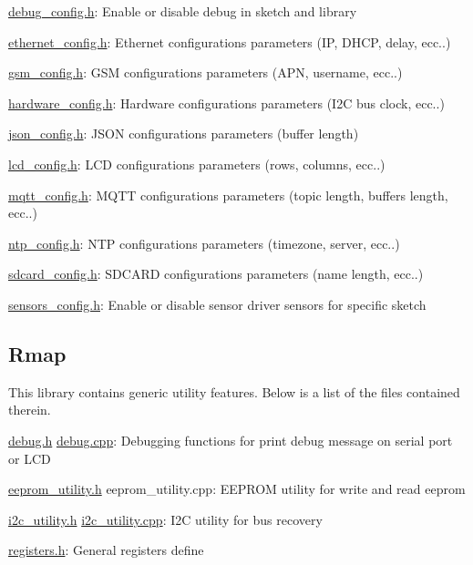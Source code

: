 \hyperlink{debug__config_8h}{debug\+\_\+config.\+h}\+: Enable or disable debug in sketch and library

\hyperlink{ethernet__config_8h}{ethernet\+\_\+config.\+h}\+: Ethernet configuration\textquotesingle{}s parameters (IP, D\+H\+CP, delay, ecc..)

\hyperlink{gsm__config_8h}{gsm\+\_\+config.\+h}\+: G\+SM configuration\textquotesingle{}s parameters (A\+PN, username, ecc..)

\hyperlink{hardware__config_8h}{hardware\+\_\+config.\+h}\+: Hardware configuration\textquotesingle{}s parameters (I2C bus clock, ecc..)

\hyperlink{json__config_8h}{json\+\_\+config.\+h}\+: J\+S\+ON configuration\textquotesingle{}s parameters (buffer length)

\hyperlink{lcd__config_8h}{lcd\+\_\+config.\+h}\+: L\+CD configuration\textquotesingle{}s parameters (rows, columns, ecc..)

\hyperlink{mqtt__config_8h}{mqtt\+\_\+config.\+h}\+: M\+Q\+TT configuration\textquotesingle{}s parameters (topic length, buffers length, ecc..)

\hyperlink{ntp__config_8h}{ntp\+\_\+config.\+h}\+: N\+TP configuration\textquotesingle{}s parameters (timezone, server, ecc..)

\hyperlink{sdcard__config_8h}{sdcard\+\_\+config.\+h}\+: S\+D\+C\+A\+RD configuration\textquotesingle{}s parameters (name length, ecc..)

\hyperlink{sensors__config_8h}{sensors\+\_\+config.\+h}\+: Enable or disable sensor driver sensors for specific sketch\hypertarget{index_rmap}{}\subsection{Rmap}\label{index_rmap}
This library contains generic utility features. Below is a list of the files contained therein.

\hyperlink{debug_8h}{debug.\+h} \hyperlink{debug_8cpp}{debug.\+cpp}\+: Debugging functions for print debug message on serial port or L\+CD

\hyperlink{eeprom__utility_8h}{eeprom\+\_\+utility.\+h} eeprom\+\_\+utility.\+cpp\+: E\+E\+P\+R\+OM utility for write and read eeprom

\hyperlink{i2c__utility_8h}{i2c\+\_\+utility.\+h} \hyperlink{i2c__utility_8cpp}{i2c\+\_\+utility.\+cpp}\+: I2C utility for bus recovery

\hyperlink{registers_8h}{registers.\+h}\+: General register\textquotesingle{}s define


